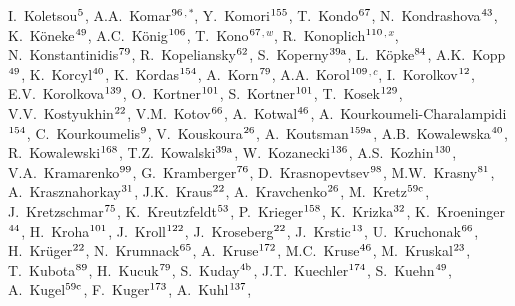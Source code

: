 \begin{flushleft}
I.~Koletsou$^\textrm{\scriptsize 5}$,
A.A.~Komar$^\textrm{\scriptsize 96}$$^{,*}$,
Y.~Komori$^\textrm{\scriptsize 155}$,
T.~Kondo$^\textrm{\scriptsize 67}$,
N.~Kondrashova$^\textrm{\scriptsize 43}$,
K.~K\"oneke$^\textrm{\scriptsize 49}$,
A.C.~K\"onig$^\textrm{\scriptsize 106}$,
T.~Kono$^\textrm{\scriptsize 67}$$^{,w}$,
R.~Konoplich$^\textrm{\scriptsize 110}$$^{,x}$,
N.~Konstantinidis$^\textrm{\scriptsize 79}$,
R.~Kopeliansky$^\textrm{\scriptsize 62}$,
S.~Koperny$^\textrm{\scriptsize 39a}$,
L.~K\"opke$^\textrm{\scriptsize 84}$,
A.K.~Kopp$^\textrm{\scriptsize 49}$,
K.~Korcyl$^\textrm{\scriptsize 40}$,
K.~Kordas$^\textrm{\scriptsize 154}$,
A.~Korn$^\textrm{\scriptsize 79}$,
A.A.~Korol$^\textrm{\scriptsize 109}$$^{,c}$,
I.~Korolkov$^\textrm{\scriptsize 12}$,
E.V.~Korolkova$^\textrm{\scriptsize 139}$,
O.~Kortner$^\textrm{\scriptsize 101}$,
S.~Kortner$^\textrm{\scriptsize 101}$,
T.~Kosek$^\textrm{\scriptsize 129}$,
V.V.~Kostyukhin$^\textrm{\scriptsize 22}$,
V.M.~Kotov$^\textrm{\scriptsize 66}$,
A.~Kotwal$^\textrm{\scriptsize 46}$,
A.~Kourkoumeli-Charalampidi$^\textrm{\scriptsize 154}$,
C.~Kourkoumelis$^\textrm{\scriptsize 9}$,
V.~Kouskoura$^\textrm{\scriptsize 26}$,
A.~Koutsman$^\textrm{\scriptsize 159a}$,
A.B.~Kowalewska$^\textrm{\scriptsize 40}$,
R.~Kowalewski$^\textrm{\scriptsize 168}$,
T.Z.~Kowalski$^\textrm{\scriptsize 39a}$,
W.~Kozanecki$^\textrm{\scriptsize 136}$,
A.S.~Kozhin$^\textrm{\scriptsize 130}$,
V.A.~Kramarenko$^\textrm{\scriptsize 99}$,
G.~Kramberger$^\textrm{\scriptsize 76}$,
D.~Krasnopevtsev$^\textrm{\scriptsize 98}$,
M.W.~Krasny$^\textrm{\scriptsize 81}$,
A.~Krasznahorkay$^\textrm{\scriptsize 31}$,
J.K.~Kraus$^\textrm{\scriptsize 22}$,
A.~Kravchenko$^\textrm{\scriptsize 26}$,
M.~Kretz$^\textrm{\scriptsize 59c}$,
J.~Kretzschmar$^\textrm{\scriptsize 75}$,
K.~Kreutzfeldt$^\textrm{\scriptsize 53}$,
P.~Krieger$^\textrm{\scriptsize 158}$,
K.~Krizka$^\textrm{\scriptsize 32}$,
K.~Kroeninger$^\textrm{\scriptsize 44}$,
H.~Kroha$^\textrm{\scriptsize 101}$,
J.~Kroll$^\textrm{\scriptsize 122}$,
J.~Kroseberg$^\textrm{\scriptsize 22}$,
J.~Krstic$^\textrm{\scriptsize 13}$,
U.~Kruchonak$^\textrm{\scriptsize 66}$,
H.~Kr\"uger$^\textrm{\scriptsize 22}$,
N.~Krumnack$^\textrm{\scriptsize 65}$,
A.~Kruse$^\textrm{\scriptsize 172}$,
M.C.~Kruse$^\textrm{\scriptsize 46}$,
M.~Kruskal$^\textrm{\scriptsize 23}$,
T.~Kubota$^\textrm{\scriptsize 89}$,
H.~Kucuk$^\textrm{\scriptsize 79}$,
S.~Kuday$^\textrm{\scriptsize 4b}$,
J.T.~Kuechler$^\textrm{\scriptsize 174}$,
S.~Kuehn$^\textrm{\scriptsize 49}$,
A.~Kugel$^\textrm{\scriptsize 59c}$,
F.~Kuger$^\textrm{\scriptsize 173}$,
A.~Kuhl$^\textrm{\scriptsize 137}$,

\end{flushleft}
